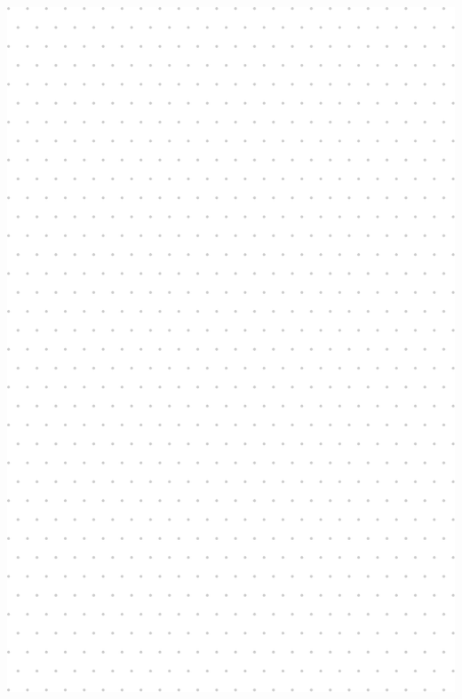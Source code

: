 \documentclass[
	openany, %
	parskip=full, %
	12pt, %
	a4paper, %
]{conferencebooklet} %
\begin{document}
\newpage
\includegraphics[width=\textwidth]{notes/notes-rest.pdf}
\end{document}

